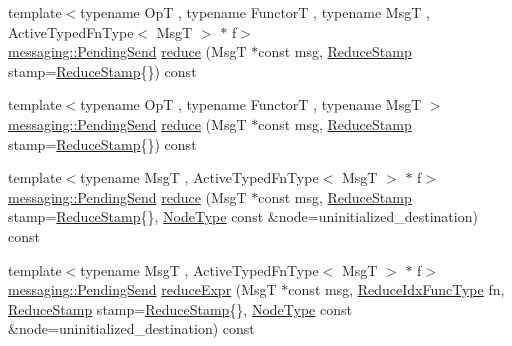 \begin{DoxyCompactItemize}
\item 
{\footnotesize template$<$typename OpT , typename FunctorT , typename MsgT , Active\+Typed\+Fn\+Type$<$ Msg\+T $>$ $\ast$ f$>$ }\\\hyperlink{structvt_1_1messaging_1_1_pending_send}{messaging\+::\+Pending\+Send} \hyperlink{structvt_1_1vrt_1_1collection_1_1_reducable_a6550107ef0246a7479dec51b015aa0f5}{reduce} (MsgT $\ast$const msg, \hyperlink{structvt_1_1vrt_1_1collection_1_1_reducable_a19f80baf23f36dad4948ef07322fd0cb}{Reduce\+Stamp} stamp=\hyperlink{structvt_1_1vrt_1_1collection_1_1_reducable_a19f80baf23f36dad4948ef07322fd0cb}{Reduce\+Stamp}\{\}) const
\item 
{\footnotesize template$<$typename OpT , typename FunctorT , typename MsgT $>$ }\\\hyperlink{structvt_1_1messaging_1_1_pending_send}{messaging\+::\+Pending\+Send} \hyperlink{structvt_1_1vrt_1_1collection_1_1_reducable_a3333825bf69de10656ca60eeddff773d}{reduce} (MsgT $\ast$const msg, \hyperlink{structvt_1_1vrt_1_1collection_1_1_reducable_a19f80baf23f36dad4948ef07322fd0cb}{Reduce\+Stamp} stamp=\hyperlink{structvt_1_1vrt_1_1collection_1_1_reducable_a19f80baf23f36dad4948ef07322fd0cb}{Reduce\+Stamp}\{\}) const
\item 
{\footnotesize template$<$typename MsgT , Active\+Typed\+Fn\+Type$<$ Msg\+T $>$ $\ast$ f$>$ }\\\hyperlink{structvt_1_1messaging_1_1_pending_send}{messaging\+::\+Pending\+Send} \hyperlink{structvt_1_1vrt_1_1collection_1_1_reducable_adec41c02a8c43b709884107d96b729e4}{reduce} (MsgT $\ast$const msg, \hyperlink{structvt_1_1vrt_1_1collection_1_1_reducable_a19f80baf23f36dad4948ef07322fd0cb}{Reduce\+Stamp} stamp=\hyperlink{structvt_1_1vrt_1_1collection_1_1_reducable_a19f80baf23f36dad4948ef07322fd0cb}{Reduce\+Stamp}\{\}, \hyperlink{namespacevt_a866da9d0efc19c0a1ce79e9e492f47e2}{Node\+Type} const \&node=uninitialized\+\_\+destination) const
\item 
{\footnotesize template$<$typename MsgT , Active\+Typed\+Fn\+Type$<$ Msg\+T $>$ $\ast$ f$>$ }\\\hyperlink{structvt_1_1messaging_1_1_pending_send}{messaging\+::\+Pending\+Send} \hyperlink{structvt_1_1vrt_1_1collection_1_1_reducable_ac126400bba751792a930f4982df137c9}{reduce\+Expr} (MsgT $\ast$const msg, \hyperlink{structvt_1_1vrt_1_1collection_1_1_reducable_a9f5a6c385efafe1fa52937f4809a9486}{Reduce\+Idx\+Func\+Type} fn, \hyperlink{structvt_1_1vrt_1_1collection_1_1_reducable_a19f80baf23f36dad4948ef07322fd0cb}{Reduce\+Stamp} stamp=\hyperlink{structvt_1_1vrt_1_1collection_1_1_reducable_a19f80baf23f36dad4948ef07322fd0cb}{Reduce\+Stamp}\{\}, \hyperlink{namespacevt_a866da9d0efc19c0a1ce79e9e492f47e2}{Node\+Type} const \&node=uninitialized\+\_\+destination) const

\end{DoxyCompactItemize}
